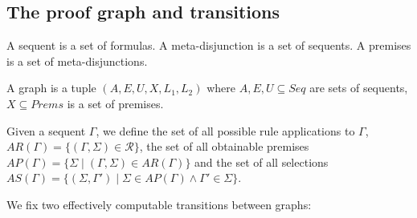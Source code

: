 \documentclass{llncs}
\begin{document}
\subsection{The proof graph and transitions}

A sequent is a set of formulas. A meta-disjunction is a set of sequents.
A premises is a set of meta-disjunctions.

A graph is a tuple $(A,E,U,X,L_1,L_2)$ where $A,E,U\subseteq Seq$ are sets of sequents,
$X\subseteq Prems$ is a set of premises.

Given a sequent $\Gamma$, we define the set of all possible rule applications to $\Gamma$,
$AR(\Gamma)=\{(\Gamma,\Sigma)\in\mathcal{R} \}$, the set of all obtainable premises
$AP(\Gamma)=\{\Sigma\mid (\Gamma,\Sigma)\in AR(\Gamma)\}$ and the set of all selections
$AS(\Gamma)=\{(\Sigma,\Gamma')\mid \Sigma\in AP(\Gamma)\wedge\Gamma'\in\Sigma\}$.

We fix two effectively computable transitions between graphs:
\end{document}
